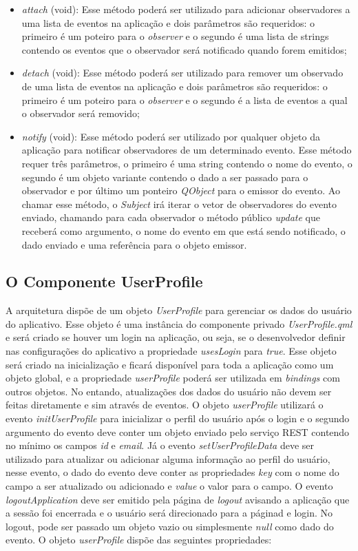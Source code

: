 \begin{itemize}
	\item \textit{attach} (void): Esse método poderá ser utilizado para adicionar observadores a uma lista de eventos na aplicação e dois parâmetros são requeridos: o primeiro é um poteiro para o \textit{observer} e o segundo é uma lista de strings contendo os eventos que o observador será notificado quando forem emitidos;
	\item \textit{detach} (void): Esse método poderá ser utilizado para remover um observado de uma lista de eventos na aplicação e dois parâmetros são requeridos: o primeiro é um poteiro para o \textit{observer} e o segundo é a lista de eventos a qual o observador será removido;
	\item \textit{notify} (void): Esse método poderá ser utilizado por qualquer objeto da aplicação para notificar observadores de um determinado evento. Esse método requer três parâmetros, o primeiro é uma string contendo o nome do evento, o segundo é um objeto variante contendo o dado a ser passado para o observador e por último um ponteiro \textit{QObject} para o emissor do evento. Ao chamar esse método, o \textit{Subject} irá iterar o vetor de observadores do evento enviado, chamando para cada observador o método público \textit{update} que receberá como argumento, o nome do evento em que está sendo notificado, o dado enviado e uma referência para o objeto emissor.
\end{itemize}


\subsection{O Componente UserProfile}\label{sec:solucao-desenvolvida}
A arquitetura dispõe de um objeto \textit{UserProfile} para gerenciar os dados do usuário do aplicativo. Esse objeto é uma instância do componente privado \textit{UserProfile.qml} e será criado se houver um login na aplicação, ou seja, se o desenvolvedor definir nas configurações do aplicativo a propriedade \textit{usesLogin} para \textit{true}. Esse objeto será criado na inicialização e ficará disponível para toda a aplicação como um objeto global, e a propriedade \textit{userProfile} poderá ser utilizada em \textit{bindings} com outros objetos. No entando, atualizações dos dados do usuário não devem ser feitas diretamente e sim através de eventos. O objeto \textit{userProfile} utilizará o evento \textit{initUserProfile} para inicializar o perfil do usuário após o login e o segundo argumento do evento deve conter um objeto enviado pelo serviço REST contendo no mínimo os campos \textit{id} e \textit{email}. Já o evento \textit{setUserProfileData} deve ser utilizado para atualizar ou adicionar alguma informação ao perfil do usuário, nesse evento, o dado do evento deve conter as propriedades \textit{key} com o nome do campo a ser atualizado ou adicionado e \textit{value} o valor para o campo. O evento \textit{logoutApplication} deve ser emitido pela página de \textit{logout} avisando a aplicação que a sessão foi encerrada e o usuário será direcionado para a páginad e login. No logout, pode ser passado um objeto vazio ou simplesmente \textit{null} como dado do evento. O objeto \textit{userProfile} dispõe das seguintes propriedades:

